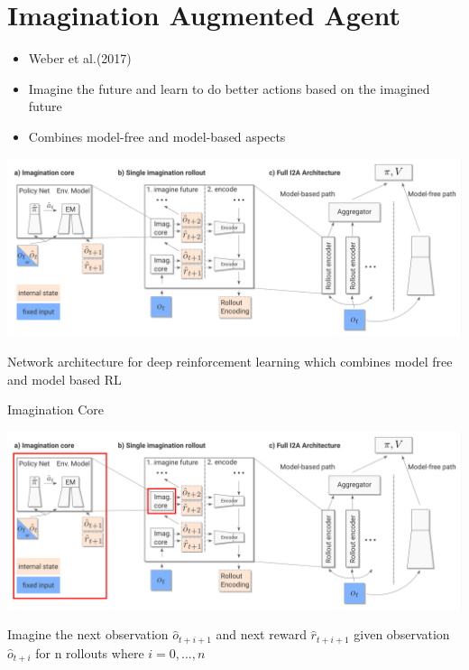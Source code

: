 \section{Imagination Augmented Agent}
\label{sec:performance_optimize}




\begin{itemize}

	\item Weber et al.(2017)
    \item Imagine the future and learn to do better actions based on the imagined future
    \item Combines model-free and model-based aspects

\end{itemize}


\includegraphics[width=\columnwidth]{./Images/i2a_architecture.png}%

\vspace{-10mm}
Network architecture for deep reinforcement learning which combines model free and model based RL



Imagination Core

\includegraphics[width=\columnwidth]{./Images/i2a_all_imagination_core.png}%

\vspace{-10mm}
Imagine the next observation $\hat{o}_{t+i+1}$ and next reward $\hat{r}_{t+i+1}$ given observation $\hat{o}_{t+i}$ for n rollouts where $i = 0, ..., n$
